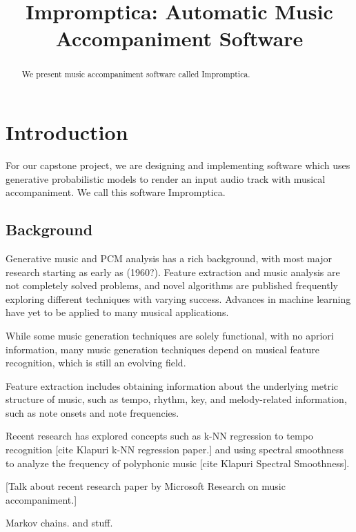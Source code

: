 \documentclass[11pt,conference,letterpaper]{IEEEtran}
\begin{document}
\title{Impromptica: Automatic Music Accompaniment Software}
\author{}

\maketitle

\begin{abstract}
We present music accompaniment software called Impromptica.
\end{abstract}

\section{Introduction}

For our capstone project, we are designing and implementing software which uses generative probabilistic models to render an input audio track with musical accompaniment. We call this software Impromptica.

\subsection{Background} 
Generative music and PCM analysis has a rich background, with most major research starting as early as (1960?). Feature extraction and music analysis are not completely solved problems, and novel algorithms are published frequently exploring different techniques with varying success. Advances in machine learning have yet to be applied to many musical applications. 

While some music generation techniques are solely functional, with no apriori information, many music generation techniques depend on musical feature recognition, which is still an evolving field.

Feature extraction includes obtaining information about the underlying metric structure of music, such as tempo, rhythm, key, and melody-related information, such as note onsets and note frequencies.

Recent research has explored concepts such as k-NN regression to tempo recognition [cite Klapuri k-NN regression paper.] and using spectral smoothness to analyze the frequency of polyphonic music [cite Klapuri Spectral Smoothness].

[Talk about recent research paper by Microsoft Research on music accompaniment.]



Markov chains. and stuff.
\end{document}
